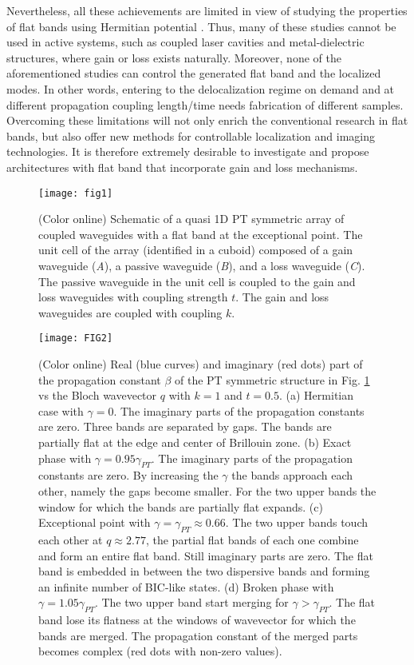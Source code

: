 \documentclass[aps,prl,twocolumn,showpacs,groupedaddress,amsmath,amssymb]{revtex4}
\begin{document}
Nevertheless, all these achievements are limited in view of studying the properties of flat bands using Hermitian potential \cite{konotop}. Thus, many of these studies cannot be used in active systems, such as coupled laser cavities and metal-dielectric structures, where gain or loss exists naturally. Moreover, none of the aforementioned studies can control the generated flat band and the localized modes. In other words, entering to the delocalization regime on demand and at different propagation coupling length/time needs fabrication of different samples. Overcoming these limitations will not only enrich the conventional research in flat bands, but also offer new methods for controllable localization and imaging technologies. It is therefore extremely desirable to investigate and propose architectures with flat band that incorporate gain and loss mechanisms.
\begin{figure}
	\texttt{[image: fig1]}
	\caption{(Color online) Schematic of a quasi 1D PT symmetric array of coupled waveguides with a flat band at the exceptional point. The unit cell of the array (identified in a cuboid) composed of a gain waveguide (\textit{A}), a passive waveguide (\textit{B}), and a loss waveguide (\textit{C}). The passive waveguide in the unit cell is coupled to the gain and loss waveguides with coupling strength $t$. The gain and loss waveguides are coupled with coupling $k$.\label{fig1}}
\end{figure}
\begin{figure}
	\texttt{[image: FIG2]}
	\caption{(Color online)  Real (blue curves) and imaginary (red dots) part of the propagation constant $\beta$ of the PT symmetric structure in Fig. \ref{fig1} vs the Bloch wavevector $q$ with $k=1$ and $t=0.5$. (a) Hermitian case with $\gamma=0$. The imaginary parts of the propagation constants are zero. Three bands are separated by gaps. The bands are partially flat at the edge and center of Brillouin zone. (b) Exact phase with $\gamma=0.95\gamma_{PT}$. The imaginary parts of the propagation constants are zero. By increasing the $\gamma$ the bands approach each other, namely the gaps become smaller. For the two upper bands the window for which the bands are partially flat expands. (c) Exceptional point with $\gamma=\gamma_{PT}\approx 0.66$. The two upper bands touch each other at $q\approx2.77$, the partial flat bands of each one combine and form an entire flat band. Still imaginary parts are zero. The flat band is embedded in between the two dispersive bands and forming an infinite number of BIC-like states. (d) Broken phase with $\gamma=1.05\gamma_{PT}$. The two upper band start merging for $\gamma>\gamma_{PT}$. The flat band lose its flatness at the windows of wavevector for which the bands are merged. The propagation constant of the merged parts becomes complex (red dots with non-zero values). \label{fig2}}
\end{figure}
\end{document}
